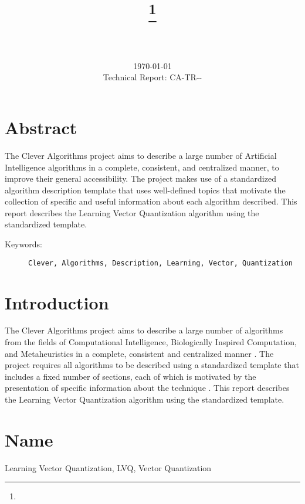 \documentclass[a4paper, 11pt]{article}
\title{{\myreporttitle}\footnote{\myreportlicense}}
\author{\myreportauthor\\{\myreportemail}\\\small\myreportproject}
\date{\today\\{\small{Technical Report: CA-TR-{\myreportdate}-\myreportversion}}}
\begin{document}
\maketitle

\section*{Abstract} 
The Clever Algorithms project aims to describe a large number of Artificial Intelligence algorithms in a complete, consistent, and centralized manner, to improve their general accessibility. 
The project makes use of a standardized algorithm description template that uses well-defined topics that motivate the collection of specific and useful information about each algorithm described.
This report describes the Learning Vector Quantization algorithm using the standardized template.

\begin{description}
	\item[Keywords:] {\small\texttt{Clever, Algorithms, Description, Learning, Vector, Quantization}}
\end{description} 

\section{Introduction} 
\label{sec:intro}
The Clever Algorithms project aims to describe a large number of algorithms from the fields of Computational Intelligence, Biologically Inspired Computation, and Metaheuristics in a complete, consistent and centralized manner \cite{Brownlee2010}.
The project requires all algorithms to be described using a standardized template that includes a fixed number of sections, each of which is motivated by the presentation of specific information about the technique \cite{Brownlee2010a}.
This report describes the Learning Vector Quantization algorithm using the standardized template.

\section{Name} 
\label{sec:name}
Learning Vector Quantization, LVQ, Vector Quantization
\end{document}
